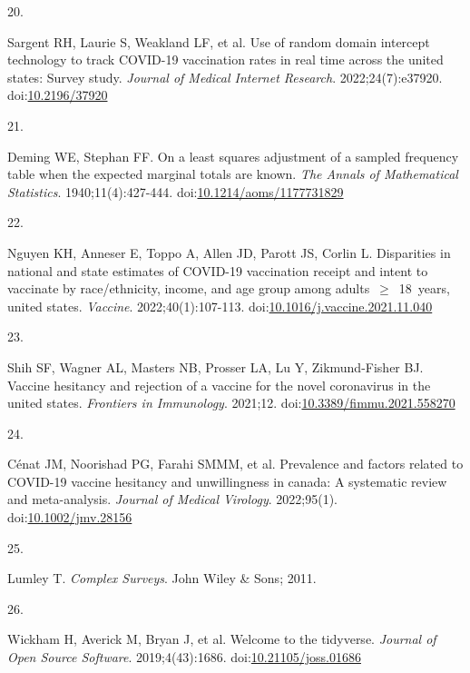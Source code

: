 \documentclass[
  letterpaper,
  DIV=11,
  numbers=noendperiod]{scrartcl}
\newlength{\cslhangindent}
\newlength{\csllabelwidth}
\newlength{\cslentryspacingunit} %
\newenvironment{CSLReferences}[2] %
 {%
  \setlength{\parindent}{0pt}
  \ifodd #1
  \let\oldpar\par
  \def\par{\hangindent=\cslhangindent\oldpar}
  \fi
  \setlength{\parskip}{#2\cslentryspacingunit}
 }%
 {}
\newcommand{\CSLLeftMargin}[1]{\parbox[t]{\csllabelwidth}{#1}}
\newcommand{\CSLRightInline}[1]{\parbox[t]{\linewidth - \csllabelwidth}{#1}\break}
\begin{document}
\begin{CSLReferences}{0}{0}
\leavevmode{}%
\CSLLeftMargin{20. }%
\CSLRightInline{Sargent RH, Laurie S, Weakland LF, et al. Use of random
domain intercept technology to track {COVID}-19 vaccination rates in
real time across the united states: Survey study. \emph{Journal of
Medical Internet Research}. 2022;24(7):e37920.
doi:\href{https://doi.org/10.2196/37920}{10.2196/37920}}

\leavevmode{}%
\CSLLeftMargin{21. }%
\CSLRightInline{Deming WE, Stephan FF. On a least squares adjustment of
a sampled frequency table when the expected marginal totals are known.
\emph{The Annals of Mathematical Statistics}. 1940;11(4):427-444.
doi:\href{https://doi.org/10.1214/aoms/1177731829}{10.1214/aoms/1177731829}}

\leavevmode{}%
\CSLLeftMargin{22. }%
\CSLRightInline{Nguyen KH, Anneser E, Toppo A, Allen JD, Parott JS,
Corlin L. Disparities in national and state estimates of {COVID}-19
vaccination receipt and intent to vaccinate by race/ethnicity, income,
and age group among adults~\(\geq\)~18~years, united states.
\emph{Vaccine}. 2022;40(1):107-113.
doi:\href{https://doi.org/10.1016/j.vaccine.2021.11.040}{10.1016/j.vaccine.2021.11.040}}

\leavevmode{}%
\CSLLeftMargin{23. }%
\CSLRightInline{Shih SF, Wagner AL, Masters NB, Prosser LA, Lu Y,
Zikmund-Fisher BJ. Vaccine hesitancy and rejection of a vaccine for the
novel coronavirus in the united states. \emph{Frontiers in Immunology}.
2021;12.
doi:\href{https://doi.org/10.3389/fimmu.2021.558270}{10.3389/fimmu.2021.558270}}

\leavevmode{}%
\CSLLeftMargin{24. }%
\CSLRightInline{Cénat JM, Noorishad PG, Farahi SMMM, et al. Prevalence
and factors related to {COVID}-19 vaccine hesitancy and unwillingness in
canada: A systematic review and meta-analysis. \emph{Journal of Medical
Virology}. 2022;95(1).
doi:\href{https://doi.org/10.1002/jmv.28156}{10.1002/jmv.28156}}

\leavevmode{}%
\CSLLeftMargin{25. }%
\CSLRightInline{Lumley T. \emph{Complex Surveys}. John Wiley \& Sons;
2011.}

\leavevmode{}%
\CSLLeftMargin{26. }%
\CSLRightInline{Wickham H, Averick M, Bryan J, et al. Welcome to the
{tidyverse}. \emph{Journal of Open Source Software}. 2019;4(43):1686.
doi:\href{https://doi.org/10.21105/joss.01686}{10.21105/joss.01686}}


\end{CSLReferences}
\end{document}
